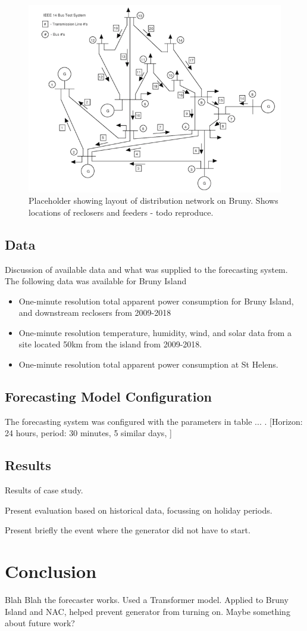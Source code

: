 \documentclass[conference]{IEEEtran}
\begin{document}
\begin{figure}[htbp]
	\centerline{\includegraphics[width=.35\textwidth]{images/bruny_network.png}}
	\caption{Placeholder showing layout of distribution network on Bruny. Shows locations of reclosers and feeders - todo reproduce.}
	\label{fig:bruny_network}
\end{figure}

\subsection{Data}
Discussion of available data and what was supplied to the forecasting system.
The following data was available for Bruny Island
\begin{itemize}
	\item One-minute resolution total apparent power consumption for Bruny Island, and downstream reclosers from 2009-2018
	\item One-minute resolution temperature, humidity, wind, and solar data from a site located 50km from the island from 2009-2018. 
	\item One-minute resolution total apparent power consumption at  St Helens. 
\end{itemize}

\subsection{Forecasting Model Configuration}
The forecasting system was configured with the parameters in table ... .
[Horizon: 24 hours, period: 30 minutes, 5 similar days, ]


\subsection{Results}
Results of case study.

Present evaluation based on historical data, focussing on holiday periods.

Present briefly the event where the generator did not have to start.

\section{Conclusion}
Blah Blah the forecaster works.
Used a Transformer model.
Applied to Bruny Island and NAC, helped prevent generator from turning on.
Maybe something about future work?
\end{document}
